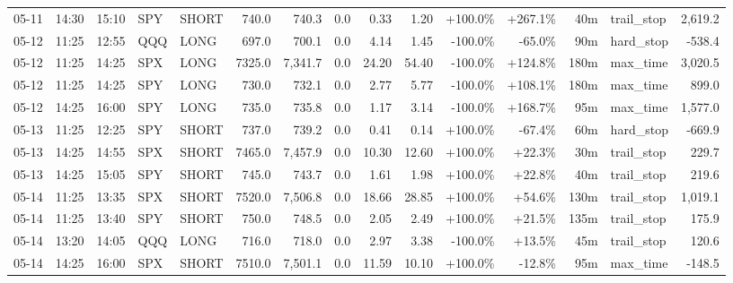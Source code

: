 \documentclass[11pt,a4paper,twoside]{article}
\begin{document}
\begin{landscape}
\begin{center}
\begin{longtable}{>{\color{txtmain}}l l l l l r r r r r r r r >{\color{txtmain}}l r}
05-11 & 14:30 & 15:10 & SPY & SHORT & 740.0 & 740.3 & 0.0 & 0.33 & 1.20 & \textcolor{wingreen}{+100.0\%} & \textcolor{wingreen}{+267.1\%} & 40m & trail\_stop & \textcolor{wingreen}{2,619.2} \\
05-12 & 11:25 & 12:55 & QQQ & LONG & 697.0 & 700.1 & 0.0 & 4.14 & 1.45 & \textcolor{lossred}{-100.0\%} & \textcolor{lossred}{-65.0\%} & 90m & hard\_stop & \textcolor{lossred}{-538.4} \\
05-12 & 11:25 & 14:25 & SPX & LONG & 7325.0 & 7,341.7 & 0.0 & 24.20 & 54.40 & \textcolor{lossred}{-100.0\%} & \textcolor{wingreen}{+124.8\%} & 180m & max\_time & \textcolor{wingreen}{3,020.5} \\
05-12 & 11:25 & 14:25 & SPY & LONG & 730.0 & 732.1 & 0.0 & 2.77 & 5.77 & \textcolor{lossred}{-100.0\%} & \textcolor{wingreen}{+108.1\%} & 180m & max\_time & \textcolor{wingreen}{899.0} \\
05-12 & 14:25 & 16:00 & SPY & LONG & 735.0 & 735.8 & 0.0 & 1.17 & 3.14 & \textcolor{lossred}{-100.0\%} & \textcolor{wingreen}{+168.7\%} & 95m & max\_time & \textcolor{wingreen}{1,577.0} \\
05-13 & 11:25 & 12:25 & SPY & SHORT & 737.0 & 739.2 & 0.0 & 0.41 & 0.14 & \textcolor{wingreen}{+100.0\%} & \textcolor{lossred}{-67.4\%} & 60m & hard\_stop & \textcolor{lossred}{-669.9} \\
05-13 & 14:25 & 14:55 & SPX & SHORT & 7465.0 & 7,457.9 & 0.0 & 10.30 & 12.60 & \textcolor{wingreen}{+100.0\%} & \textcolor{wingreen}{+22.3\%} & 30m & trail\_stop & \textcolor{wingreen}{229.7} \\
05-13 & 14:25 & 15:05 & SPY & SHORT & 745.0 & 743.7 & 0.0 & 1.61 & 1.98 & \textcolor{wingreen}{+100.0\%} & \textcolor{wingreen}{+22.8\%} & 40m & trail\_stop & \textcolor{wingreen}{219.6} \\
05-14 & 11:25 & 13:35 & SPX & SHORT & 7520.0 & 7,506.8 & 0.0 & 18.66 & 28.85 & \textcolor{wingreen}{+100.0\%} & \textcolor{wingreen}{+54.6\%} & 130m & trail\_stop & \textcolor{wingreen}{1,019.1} \\
05-14 & 11:25 & 13:40 & SPY & SHORT & 750.0 & 748.5 & 0.0 & 2.05 & 2.49 & \textcolor{wingreen}{+100.0\%} & \textcolor{wingreen}{+21.5\%} & 135m & trail\_stop & \textcolor{wingreen}{175.9} \\
05-14 & 13:20 & 14:05 & QQQ & LONG & 716.0 & 718.0 & 0.0 & 2.97 & 3.38 & \textcolor{lossred}{-100.0\%} & \textcolor{wingreen}{+13.5\%} & 45m & trail\_stop & \textcolor{wingreen}{120.6} \\
05-14 & 14:25 & 16:00 & SPX & SHORT & 7510.0 & 7,501.1 & 0.0 & 11.59 & 10.10 & \textcolor{wingreen}{+100.0\%} & \textcolor{lossred}{-12.8\%} & 95m & max\_time & \textcolor{lossred}{-148.5} \\

\end{longtable}
\end{center}
\end{landscape}
\end{document}
